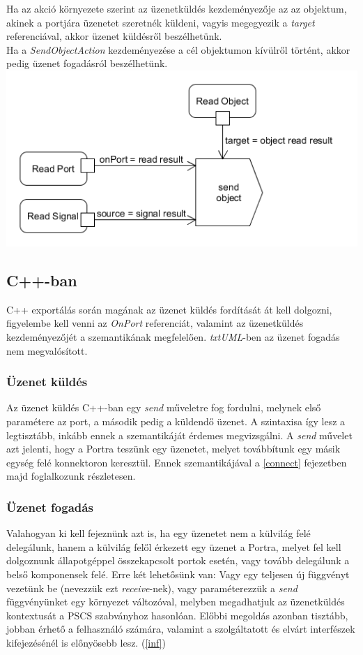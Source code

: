 \documentclass[a4paper,12pt]{report}
\begin{document}
Ha az akció környezete szerint az üzenetküldés kezdeményezője az az objektum, akinek a portjára üzenetet szeretnék küldeni, vagyis megegyezik a \textit{target} referenciával, akkor üzenet küldésről beszélhetünk. \\
Ha a \textit{SendObjectAction} kezdeményezése a cél objektumon kívülről történt, akkor pedig üzenet fogadásról beszélhetünk. \\
 

\includegraphics[scale=0.6]{receive_uml.png}

\subsection{C++-ban}
C++ exportálás során magának az üzenet küldés fordítását át kell dolgozni, figyelembe kell venni az \textit{OnPort} referenciát, valamint az üzenetküldés kezdeményezőjét a szemantikának megfelelően. \textit{txtUML}-ben az üzenet fogadás nem megvalósított.

\subsubsection{Üzenet küldés}
Az üzenet küldés C++-ban egy \textit{send} műveletre fog fordulni, melynek első paramétere az port, a második pedig a küldendő üzenet. A szintaxisa így lesz a legtisztább, inkább ennek a szemantikáját érdemes megvizsgálni. A \textit{send} művelet azt jelenti, hogy a Portra teszünk egy üzenetet, melyet továbbítunk egy másik egység felé konnektoron keresztül. Ennek szemantikájával a \ref{connect} fejezetben majd foglalkozunk részletesen.

\subsubsection{Üzenet fogadás}
Valahogyan ki kell fejeznünk azt is, ha egy üzenetet nem a külvilág felé delegálunk, hanem a külvilág felől érkezett egy üzenet a Portra, melyet fel kell dolgoznunk állapotgéppel összekapcsolt portok esetén, vagy tovább delegálunk a belső komponensek felé. Erre két lehetősünk van: Vagy egy teljesen új függvényt vezetünk be (nevezzük ezt \textit{receive}-nek), vagy paraméterezzük a \textit{send} függvényünket egy környezet változóval, melyben megadhatjuk az üzenetküldés kontextusát a PSCS szabványhoz hasonlóan. Előbbi megoldás azonban tisztább, jobban érhető a felhasználó számára, valamint a szolgáltatott és elvárt interfészek kifejezésénél is előnyösebb lesz. (\ref{inf}) \\
\end{document}

